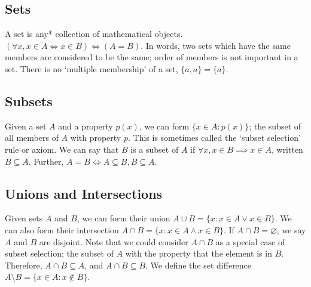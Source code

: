 \subsection{Sets}
A set is any* collection of mathematical objects. \((\forall x, x \in A \iff x \in B) \iff (A = B)\). In words, two sets which have the same members are considered to be the same; order of members is not important in a set. There is no `multiple membership' of a set, \(\{ a, a \} = \{ a \}\).

\subsection{Subsets}
Given a set \(A\) and a property \(p(x)\), we can form \(\{ x \in A: p(x) \}\); the subset of all members of \(A\) with property \(p\). This is sometimes called the `subset selection' rule or axiom. We can say that \(B\) is a subset of \(A\) if \(\forall x, x \in B \implies x \in A\), written \(B \subseteq A\). Further, \(A = B \iff A \subseteq B, B \subseteq A\).

\subsection{Unions and Intersections}
Given sets \(A\) and \(B\), we can form their union \(A \cup B = \{ x: x \in A \lor x \in B \}\). We can also form their intersection \(A \cap B = \{ x: x \in A \wedge x \in B \}\). If \(A \cap B = \varnothing\), we say \(A\) and \(B\) are disjoint. Note that we could consider \(A \cap B\) as a special case of subset selection; the subset of \(A\) with the property that the element is in \(B\). Therefore, \(A \cap B \subseteq A\), and \(A \cap B \subseteq B\). We define the set difference \(A \setminus B = \{ x \in A: x \notin B \}\).

